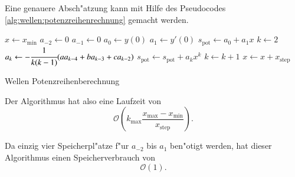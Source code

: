 Eine genauere Absch"atzung kann mit Hilfe des Pseudocodes 
\ref{alg:wellen:potenzreihenrechnung} gemacht werden.

\begin{algorithm}
	\begin{algorithmic}[1]
		\State $x \gets x_{\text{min}}$
			\State $a_{-2} \gets 0$
			\State $a_{-1} \gets 0$
			\State $a_0 \gets y(0)$
			\State $a_1 \gets y'(0)$
			\State $s_{\text{pot}} \gets a_0 + a_1x$
			\State $k \gets 2$
				\State $a_k \gets -\cfrac{1}{k(k-1)}			
				(aa_{k-4}+ba_{k-3}+ca_{k-2})$
				\State $s_{\text{pot}} \gets s_{\text{pot}} + a_k x^k$
				\State $k \gets k + 1$
			\EndFor
			\State $x \gets x + x_{\text{step}}$
		\EndFor
	\end{algorithmic}
	\caption{Wellen Potenzreihenberechnung} 
	\label{alg:wellen:potenzreihenrechnung}
\end{algorithm}

Der Algorithmus hat also eine Laufzeit von
\begin{equation*}
	\mathcal{O}
	\left(
		k_{\text{max}}\frac{x_{\text{max}}-x_{\text{min}}}{x_{\text{step}}}
	\right).
\end{equation*}

Da einzig vier Speicherpl"atze f"ur $a_{-2}$ bis $a_1$ ben"otigt werden, hat 
dieser Algorithmus einen Speicherverbrauch von
\begin{equation*}
	\mathcal{O}
	\left(
		1
	\right).
\end{equation*}